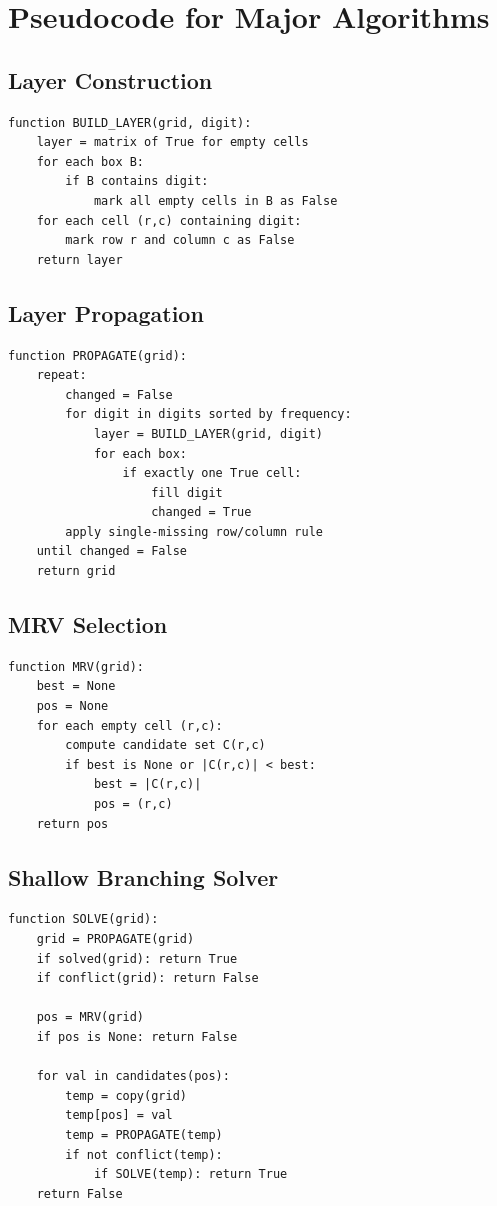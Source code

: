 \documentclass[11pt]{article}
\begin{document}
\section{Pseudocode for Major Algorithms}

\subsection{Layer Construction}
\begin{verbatim}
function BUILD_LAYER(grid, digit):
    layer = matrix of True for empty cells
    for each box B:
        if B contains digit:
            mark all empty cells in B as False
    for each cell (r,c) containing digit:
        mark row r and column c as False
    return layer
\end{verbatim}

\subsection{Layer Propagation}
\begin{verbatim}
function PROPAGATE(grid):
    repeat:
        changed = False
        for digit in digits sorted by frequency:
            layer = BUILD_LAYER(grid, digit)
            for each box:
                if exactly one True cell:
                    fill digit
                    changed = True
        apply single-missing row/column rule
    until changed = False
    return grid
\end{verbatim}

\subsection{MRV Selection}
\begin{verbatim}
function MRV(grid):
    best = None
    pos = None
    for each empty cell (r,c):
        compute candidate set C(r,c)
        if best is None or |C(r,c)| < best:
            best = |C(r,c)|
            pos = (r,c)
    return pos
\end{verbatim}

\subsection{Shallow Branching Solver}
\begin{verbatim}
function SOLVE(grid):
    grid = PROPAGATE(grid)
    if solved(grid): return True
    if conflict(grid): return False

    pos = MRV(grid)
    if pos is None: return False

    for val in candidates(pos):
        temp = copy(grid)
        temp[pos] = val
        temp = PROPAGATE(temp)
        if not conflict(temp):
            if SOLVE(temp): return True
    return False
\end{verbatim}
\end{document}
